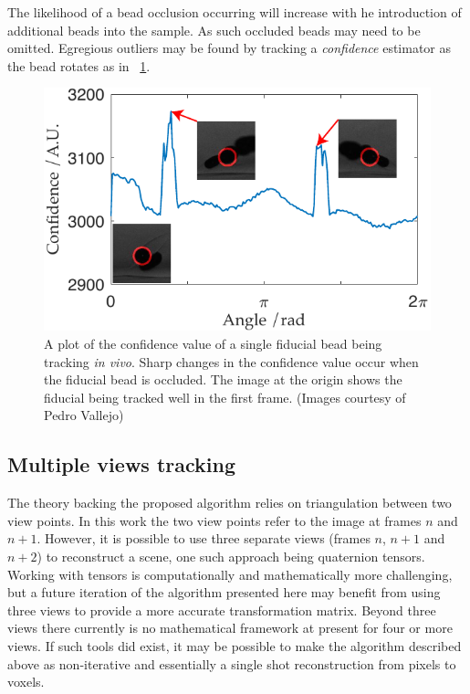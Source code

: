 The likelihood of a bead occlusion occurring will increase with he introduction of additional beads into the sample.
As such occluded beads may need to be omitted.%
Egregious outliers may be found by tracking a \emph{confidence} estimator as the bead rotates as in
\figurename~\ref{fig:confidence_bead_tracking}.

\begin{figure}
  \centering
  \includegraphics{Chapters/flopt/Figs/PDF/results/confidence_bead_tracking}
  \caption{A plot of the confidence value of a single fiducial bead being tracking \emph{in vivo}.
  Sharp changes in the confidence value occur when the fiducial bead is occluded.
  The image at the origin shows the fiducial being tracked well in the first frame.
  (Images courtesy of Pedro Vallejo)
  }
  \label{fig:confidence_bead_tracking}
\end{figure}

\subsection{Multiple views tracking}
The theory backing the proposed algorithm relies on triangulation between two view points.
In this work the two view points refer to the image at frames \(n\) and \(n+1\).
However, it is possible to use three separate views (frames \(n\), \(n+1\) and \(n+2\)) to reconstruct a scene, one such approach being quaternion tensors.
Working with tensors is computationally and mathematically more challenging, but a future iteration of the algorithm presented here may benefit from using three views to provide a more accurate transformation matrix.
Beyond three views there currently is no mathematical framework at present for four or more views.
If such tools did exist, it may be possible to make the algorithm described above as non-iterative and essentially a single shot reconstruction from pixels to voxels.

